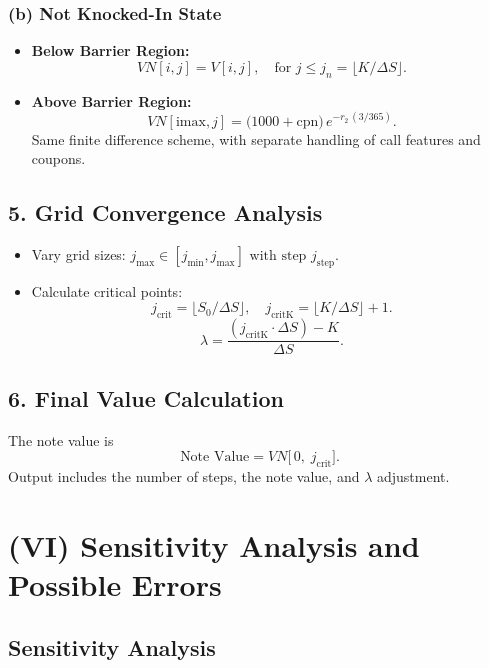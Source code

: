 \documentclass[12pt,a4paper]{article}
\begin{document}
\subsubsection*{(b) Not Knocked-In State}
\begin{itemize}
\item \textbf{Below Barrier Region:}
  \[
    VN[i,j] = V[i,j], 
    \quad \text{for } j \le j_n = \lfloor K / \Delta S \rfloor.
  \]
\item \textbf{Above Barrier Region:}
  \[
    VN[\text{imax}, j] = \bigl(1000 + \text{cpn}\bigr)\,
                         e^{-r_2\, (3/365)}.
  \]
  Same finite difference scheme, with separate handling of call features and coupons.
\end{itemize}

\subsection*{5. Grid Convergence Analysis}
\begin{itemize}
\item Vary grid sizes: \(j_{\max} \in [j_{\min}, j_{\max}] \text{ with step } j_{\text{step}}.\)
\item Calculate critical points:
  \[
    j_{\text{crit}} = \lfloor S_0 / \Delta S\rfloor, 
    \quad
    j_{\text{critK}} = \lfloor K / \Delta S\rfloor + 1.
  \]
  \[
    \lambda = \frac{(j_{\text{critK}}\cdot \Delta S) - K}{\Delta S}.
  \]
\end{itemize}

\subsection*{6. Final Value Calculation}
The note value is
\[
  \text{Note Value} = VN\bigl[\,0,\; j_{\text{crit}}\bigr].
\]
Output includes the number of steps, the note value, and \(\lambda\) adjustment.

\section*{(VI) Sensitivity Analysis and Possible Errors}

\subsection*{Sensitivity Analysis}
\end{document}
